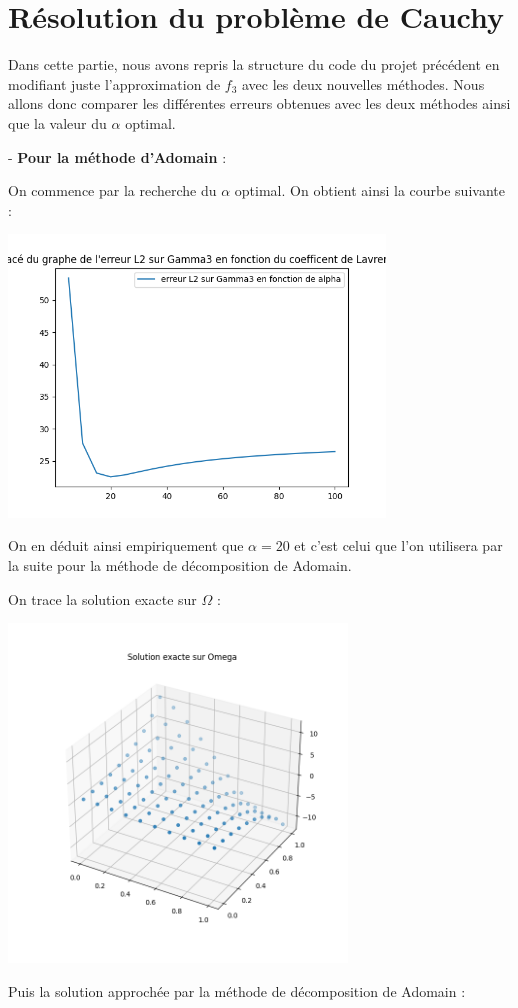 \documentclass{article}
\begin{document}
\section{Résolution du problème de Cauchy}
    

    Dans cette partie, nous avons repris la structure du code du projet précédent en modifiant juste l'approximation de $f_3$ avec les deux nouvelles méthodes. Nous allons donc comparer les différentes erreurs obtenues avec les deux méthodes ainsi que la valeur du $\alpha$ optimal.

\bigskip

    - \textbf{Pour la méthode d'Adomain} :

     On commence par la recherche du $\alpha$ optimal. On obtient ainsi la courbe suivante :

     
     \bigskip
    {
\includegraphics[width=10cm]{Etude_erreur_selon_alpha_adomain.png} \par}
\bigskip

    On en déduit ainsi empiriquement que $\alpha = 20$ et c'est celui que l'on utilisera par la suite pour la méthode de décomposition de Adomain.

    \bigskip

    On trace la solution exacte sur $\Omega$ :

        {
    \includegraphics[width=9cm]{solex_omega.png} \par}
    \bigskip
     Puis la solution approchée par la méthode de décomposition de Adomain :
\end{document}
